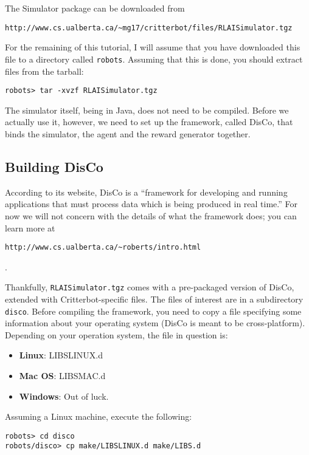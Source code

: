 \documentclass[12pt]{article}
\begin{document}
The Simulator package can be downloaded from

\begin{verbatim}
http://www.cs.ualberta.ca/~mg17/critterbot/files/RLAISimulator.tgz
\end{verbatim}

For the remaining of this tutorial, I will assume that you have downloaded
this file to a directory called \verb+robots+. Assuming that this is done, 
you should extract files from the tarball:

\begin{verbatim}robots> tar -xvzf RLAISimulator.tgz \end{verbatim}

The simulator itself, being in Java, does not need to be compiled. Before
we actually use it, however, we need to set up the framework, called DisCo,
that binds the simulator, the agent and the reward generator together.

\subsection{Building DisCo}

According to its website, DisCo is a ``framework for developing and running 
applications that must process data which is being produced in real time.'' 
For now we will not
concern with the details of what the framework does; you can learn more at
\begin{verbatim}http://www.cs.ualberta.ca/~roberts/intro.html\end{verbatim}.

Thankfully, \verb+RLAISimulator.tgz+ comes with a pre-packaged version of 
DisCo, extended with Critterbot-specific files. The files of interest are in
a subdirectory \verb+disco+. Before compiling the framework, you need to copy 
a file specifying some information about your operating system (DisCo is meant
to be cross-platform). Depending on your operation system, the file in 
question is:

\begin{itemize}
\item{\textbf{Linux}: LIBSLINUX.d}
\item{\textbf{Mac OS}: LIBSMAC.d}
\item{\textbf{Windows}: Out of luck.}
\end{itemize}

Assuming a Linux machine, execute the following:

\begin{verbatim}
robots> cd disco
robots/disco> cp make/LIBSLINUX.d make/LIBS.d
\end{verbatim}
\end{document}
